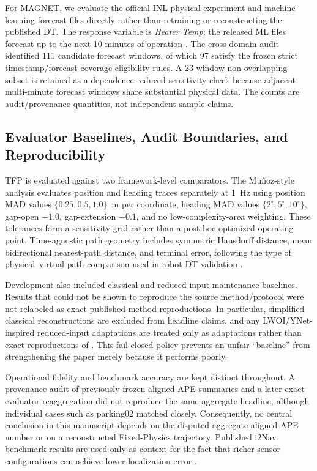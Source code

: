 \documentclass[journal]{IEEEtran}
\begin{document}
For MAGNET, we evaluate the official INL physical experiment and machine-learning forecast files directly rather than retraining or reconstructing the published DT. The response variable is \emph{Heater Temp}; the released ML files forecast up to the next 10 minutes of operation \cite{inlmagnetdata}. The cross-domain audit identified 111 candidate forecast windows, of which 97 satisfy the frozen strict timestamp/forecast-coverage eligibility rules. A 23-window non-overlapping subset is retained as a dependence-reduced sensitivity check because adjacent multi-minute forecast windows share substantial physical data. The counts are audit/provenance quantities, not independent-sample claims.

\subsection{Evaluator Baselines, Audit Boundaries, and Reproducibility}
TFP is evaluated against two framework-level comparators. The Mu\~noz-style analysis evaluates position and heading traces separately at 1~Hz using position MAD values $\{0.25,0.5,1.0\}$~m per coordinate, heading MAD values $\{2^\circ,5^\circ,10^\circ\}$, gap-open $-1.0$, gap-extension $-0.1$, and no low-complexity-area weighting. These tolerances form a sensitivity grid rather than a post-hoc optimized operating point. Time-agnostic path geometry includes symmetric Hausdorff distance, mean bidirectional nearest-path distance, and terminal error, following the type of physical--virtual path comparison used in robot-DT validation \cite{bergs2025}.

Development also included classical and reduced-input maintenance baselines. Results that could not be shown to reproduce the source method/protocol were not relabeled as exact published-method reproductions. In particular, simplified classical reconstructions are excluded from headline claims, and any LWOI/YNet-inspired reduced-input adaptations are treated only as adaptations rather than exact reproductions of \cite{brossard2019,zhou2025ynet}. This fail-closed policy prevents an unfair ``baseline'' from strengthening the paper merely because it performs poorly.

Operational fidelity and benchmark accuracy are kept distinct throughout. A provenance audit of previously frozen aligned-APE summaries and a later exact-evaluator reaggregation did not reproduce the same aggregate headline, although individual cases such as parking02 matched closely. Consequently, no central conclusion in this manuscript depends on the disputed aggregate aligned-APE number or on a reconstructed Fixed-Physics trajectory. Published i2Nav benchmark results are used only as context for the fact that richer sensor configurations can achieve lower localization error \cite{tang2025}.
\end{document}

